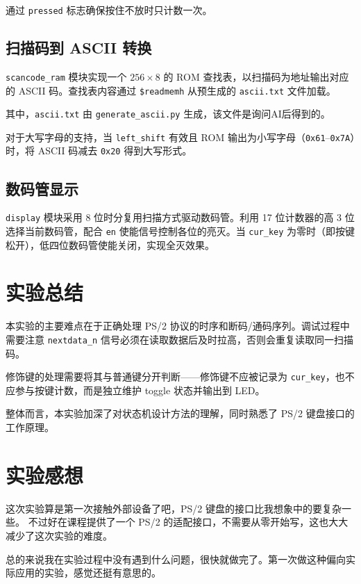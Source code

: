 \documentclass[12pt, a4paper]{ctexart}
\begin{document}
通过 \texttt{pressed} 标志确保按住不放时只计数一次。

\subsection{扫描码到 ASCII 转换}

\texttt{scancode\_ram} 模块实现一个 $256\times 8$ 的 ROM 查找表，以扫描码为地址输出对应的 ASCII 码。查找表内容通过 \texttt{\$readmemh} 从预生成的 \texttt{ascii.txt} 文件加载。

其中，\texttt{ascii.txt} 由 \texttt{generate\_ascii.py} 生成，该文件是询问AI后得到的。

对于大写字母的支持，当 \texttt{left\_shift} 有效且 ROM 输出为小写字母（\texttt{0x61}--\texttt{0x7A}）时，将 ASCII 码减去 \texttt{0x20} 得到大写形式。

\subsection{数码管显示}

\texttt{display} 模块采用 8 位时分复用扫描方式驱动数码管。利用 17 位计数器的高 3 位选择当前数码管，配合 \texttt{en} 使能信号控制各位的亮灭。当 \texttt{cur\_key} 为零时（即按键松开），低四位数码管使能关闭，实现全灭效果。

\section{实验总结}

本实验的主要难点在于正确处理 PS/2 协议的时序和断码/通码序列。调试过程中需要注意 \texttt{nextdata\_n} 信号必须在读取数据后及时拉高，否则会重复读取同一扫描码。

修饰键的处理需要将其与普通键分开判断——修饰键不应被记录为 \texttt{cur\_key}，也不应参与按键计数，而是独立维护 toggle 状态并输出到 LED。

整体而言，本实验加深了对状态机设计方法的理解，同时熟悉了 PS/2 键盘接口的工作原理。

\section{实验感想}

这次实验算是第一次接触外部设备了吧，PS/2 键盘的接口比我想象中的要复杂一些。
不过好在课程提供了一个 PS/2 的适配接口，不需要从零开始写，这也大大减少了这次实验的难度。

总的来说我在实验过程中没有遇到什么问题，很快就做完了。第一次做这种偏向实际应用的实验，感觉还挺有意思的。
\end{document}
